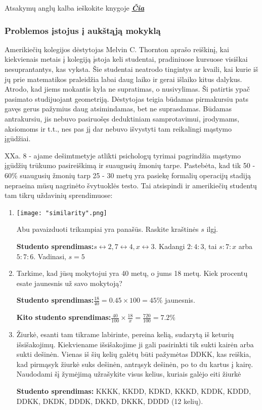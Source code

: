 \documentclass{article}
\begin{document}
Atsakymų anglų kalba ieškokite knygoje \href{https://www.dropbox.com/s/w0m9haikka8trpq/tuxdoc.com_liping-ma-knowing-and-teaching-elementary-mathematics-teachers-understanding-of-fundamental-mathematics-in-china-and-the-united-states.pdf?dl=0}{\textbf{\textit{Čia}}}
\subsubsection{Problemos įstojus į aukštąją mokyklą}

Amerikiečių kolegijos dėstytojas Melvin C. Thornton aprašo reiškinį, kai kiekvienais metais į kolegiją įstoja keli studentai, pradiniuose kursuose visiškai nesuprantantys, kas vyksta. Šie studentai neatrodo tingintys ar kvaili, kai kurie iš jų prie matematikos praleidžia labai daug laiko ir gerai išlaiko kitus dalykus. Atrodo, kad jiems mokantis kyla ne supratimas, o nusivylimas. Ši patirtis ypač pasimato studijuojant geometriją. Dėstytojas teigia būdamas pirmakursiu pats gavęs gerus pažymius daug atsimindamas, bet ne suprasdamas. Būdamas antrakursiu, jis nebuvo pasiruošęs deduktiniam samprotavimui, įrodymams, aksiomoms ir t.t., nes pas jį dar nebuvo išvystyti tam reikalingi mąstymo įgūdžiai.

XXa. 8 - ajame dešimtmetyje atlikti psichologų tyrimai pagrindžia mąstymo įgūdžių trūkumo pasireiškimą ir suaugusių žmonių tarpe. Pastebėta, kad tik 50 - 60\% suaugusių žmonių tarp 25 - 30 metų yra pasiekę formalių operacijų stadiją nepraeina mūsų nagrinėto švytuoklės testo. Tai atsispindi ir amerikiečių studentų tam tikrų uždavinių sprendimuose: 

\begin{enumerate}
\item \texttt{[image: "similarity".png]}

Abu pavaizduoti trikampiai yra panašūs. Raskite kraštinės $s$ ilgį.  

\textbf{Studento sprendimas:}$s \leftrightarrow 2, 7 \leftrightarrow 4, x \leftrightarrow 3$. Kadangi $2:4:3$, tai $s:7:x$ arba $5:7:6$. Vadinasi, $s=5$

\item Tarkime, kad jūsų mokytojui yra 40 metų, o jums 18 metų. Kiek procentų esate jaunesnis už savo mokytoją?

\textbf{Studento sprendimas:}$\frac{18}{40}=0.45\times 100=45\%$ jaunesnis.

\textbf{Kito studento sprendimas:}$\frac{40}{100}\times\frac{18}{x}=\frac{720}{100}=7.2\%$

\item Žiurkė, esanti tam tikrame labirinte, pereina kelią, sudarytą iš keturių išsišakojimų. Kiekviename išsišakojime ji gali pasirinkti tik sukti kairėn arba sukti dešinėn. Vienas iš šių kelių galėtų būti pažymėtas DDKK, kas reiškia, kad pirmąsyk žiurkė suks dešinėn, antrąsyk dešinėn, po to du kartus į kairę. Naudodami šį žymėjimą užrašykite visus kelius, kuriais galėjo eiti žiurkė

\textbf{Studento sprendimas:} KKKK, KKDD, KDKD, KKKD, KDDK, KDDD, DDKK, DKDK, DDDK, DKKD, DKKK, DDDD (12 kelių).
\end{enumerate}
\end{document}
